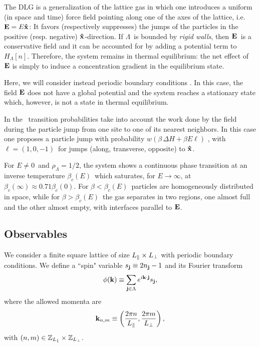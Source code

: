 \documentclass[12pt]{article}
\begin{document}
The DLG is a generalization of the lattice gas in which one 
introduces a uniform (in space and time) force field
pointing along one of the axes of the lattice, i.e. ${\bf E}=E{\bf \hat{x}}$:
It favors (respectively suppresses) the jumps of the particles in the 
positive (resp. negative) ${\bf \hat{x}}$-direction.
If $\Lambda$\ is
bounded by {\it rigid walls}, then ${\bf E}$\ is a conservative field and 
it can be accounted for by adding a potential term
to $H_\Lambda[n]$. Therefore, the system remains in thermal equilibrium:
the net effect of ${\bf E}$ is simply to induce a concentration gradient in the
equilibrium state. 

Here, we will consider instead periodic boundary conditions \cite{foot4}.
In this case, the field ${\bf E}$ does not have a global potential and  
the system reaches a stationary state which, however, is not a state 
in thermal equilibrium.

In the \dlg\  transition
probabilities take into account the work done by the field during the
particle jump from one site to one of its nearest neighbors. In this case
one proposes a particle jump with probability 
       $w(\beta\,\Delta H+\beta E \ell )$     ,
with $\ell = (1, 0, -1)$\ for jumps (along, transverse, opposite) to 
${\bf \hat{x}}$.

For $E \neq 0$\ and $\rho_{\Lambda}=1/2$, the system shows a continuous phase
transition at an
inverse temperature $\beta_{c}(E)$\ which saturates, for
$E\rightarrow\infty$, at $\beta_{c}(\infty) \approx 0.71
\beta_{c}(0)$. For $\beta<\beta_{c}(E)$\ particles are  homogeneously
distributed in space, while for $\beta>\beta_{c}(E)$\ the gas
separates in two regions, one almost full and the other almost empty,
with interfaces parallel to ${\bf E}$.
  

\subsection{Observables}
\label{sec:observables}

We consider a finite square lattice of size $L_{\|}\times
L_{\bot}$ with periodic boundary conditions. We define 
a ``spin" variable $s_{{\bf j}} \equiv  2 n_{{\bf j}} - 1$ 
and its Fourier transform 
\begin{equation}
        \phi({\bf k}) \equiv \sum_{{\bf j}\in\Lambda} 
         e^{i {\bf k}\cdot{\bf j}} s_{{\bf j}},
\end{equation}
where the allowed momenta are
\begin{equation}
        {\bf k}_{n,m} \equiv
      \left (\frac{2\pi n}{L_{\|}},\frac{2\pi m}{L_{\bot}} \right ),
\end{equation}
with $(n,m)\in\mathbb{Z}_\protect{L_{\|}}\times\mathbb{Z}_\protect{L_{\bot}} $. 
\end{document}

